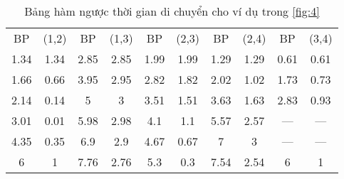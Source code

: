 \documentclass[../main.tex]{subfiles}
\begin{document}
\begin{table}[H]
    \centering
    \caption{Bảng hàm ngược thời gian di chuyển cho ví dụ trong \autoref{fig:4}}
    \label{tabel:rev-arc}
    \small
    \setlength\extrarowheight{-1pt}
    \begin{tabular}{|c|c||c|c||c|c||c|c||c|c|}
    \toprule
    BP   & (1,2) & BP   & (1,3) & BP   & (2,3) & BP   & (2,4) & BP   & (3,4) \\ 
    1.34 & 1.34  & 2.85 & 2.85  & 1.99 & 1.99  & 1.29 & 1.29  & 0.61 & 0.61  \\ 
    1.66 & 0.66  & 3.95 & 2.95  & 2.82 & 1.82  & 2.02 & 1.02  & 1.73 & 0.73  \\ 
    2.14 & 0.14  & 5    & 3     & 3.51 & 1.51  & 3.63 & 1.63  & 2.83 & 0.93  \\ 
    3.01 & 0.01  & 5.98 & 2.98  & 4.1  & 1.1   & 5.57 & 2.57  & --- & ---  \\ 
    4.35 & 0.35  & 6.9  & 2.9   & 4.67 & 0.67  & 7    & 3     & --- & ---  \\ 
    6    & 1     & 7.76 & 2.76  & 5.3  & 0.3   & 7.54 & 2.54  & 6    & 1     \\ 
    \bottomrule
    \end{tabular}
\end{table}
\end{document}
